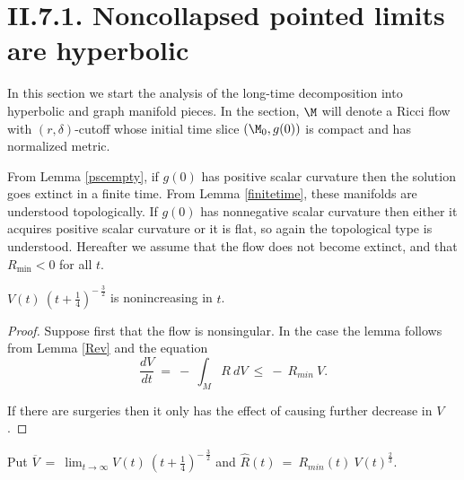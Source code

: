 \section{II.7.1. Noncollapsed pointed limits are hyperbolic} \label{II.7.1}

In this section we start the analysis of the long-time decomposition
into hyperbolic and graph manifold pieces. In the section,
$\M$ will denote a Ricci flow with $(r,\delta)$-cutoff whose initial time slice
$(\M_0, g(0))$ is compact and has normalized metric.

From Lemma \ref{pscempty}, if
$g(0)$ has positive scalar curvature then the solution goes extinct
in a finite time.  From Lemma \ref{finitetime}, these manifolds are understood
topologically. If $g(0)$ has nonnegative scalar curvature then
either it acquires positive scalar curvature or it is flat, so again
the topological type is understood.
Hereafter we assume that the flow
does not become extinct, and
that $R_{\min}<0$ for all $t$.

\begin{lemma}
  \label{lem:kl-noncollapsed-pointed-limits-hyperbolic-monotonicity-noncollapsing}

$V(t) \: \left( t + \frac14 \right)^{- \: \frac32}$ is nonincreasing in $t$.
\end{lemma}
\begin{proof}
Suppose first that the flow is nonsingular. In the case the lemma follows
from Lemma \ref{Rev} and the equation
\begin{equation} \label{dVdt}
\frac{dV}{dt} \: = \: - \: \int_M R \: dV \: \le \: - \: R_{min} \: V.
\end{equation}

If there are surgeries then it only has the effect of causing further
decrease in $V$.
\end{proof}

\begin{definition}
  \label{def:kl-noncollapsed-pointed-limits-hyperbolic-noncollapsing-definition}
 \label{VR}
Put $\overline{V} \: = \: \lim_{t \rightarrow \infty} V(t) \: \left( t + \frac14 \right)^{- \: \frac32}$
and $\hat{R}(t) \: = \: R_{min}(t) \: V(t)^{\frac23}$.
\end{definition}

